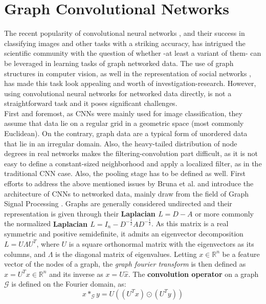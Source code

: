 \section{Graph Convolutional Networks}

The recent popularity of convolutional neural networks \cite{40k}, and their
success in classifying images and other tasks with a striking accuracy, has intrigued the scientific
community with the question of whether -at least a variant of them- can be leveraged in learning tasks
of graph networked data. The use of graph structures in computer
vision\cite{survey}, as well in the representation of social networks
\cite{kleinberg_book}, has made this task look appealing and worth of investigation-research.
However, using convolutional neural networks for
networked data directly, is not a straightforward task and it poses significant
challenges.\\
 First and foremost,
as CNNs were mainly used for image classification, they assume that
data lie on a regular grid in a geometric space (most commonly
Euclidean). On the contrary, graph data are a typical form of unordered data that lie in
an irregular domain. Also, the heavy-tailed distribution of node degrees
in real networks \cite{smth} makes the filtering-convolution part difficult,
as it is not easy to define a constant-sized neighborhood and apply a
localized filter, as in the traditional CNN case. Also, the pooling stage has to
be defined as well.
 First efforts to address the above mentioned issues
by Bruna et al. \cite{Lecun} and introduce the architecture of CNNs to networked data,
mainly draw from the field of Graph Signal Processing \cite{shuman}.
Graphs are generally considered undirected and their representation is given
through their \textbf{Laplacian $L = D -A$} or more commonly the normalized
\textbf{Laplacian $L = I_n - D^{-\frac{1}{2}}AD^{-\frac{1}{2}}$}. As this matrix
is a real symmetric and positive semidefinite, it admits an eigenvector
decomposition $L=U\Lambda U^T$, where $U$ is a square orthonormal matrix with
the eigenvectors as its columns, and $\Lambda$ is the diagonal matrix of eigenvalues.
Letting $x\in \mathbb{R}^{n}$ be a feature vector of the nodes of a graph,
the {\em graph fourier transform} is then defined as $\hat{x}=U^T x \in \mathbb{R}^n$
and its inverse as $x = U\hat{x}$. The \textbf{convolution operator} on a graph
$\mathcal{G}$ is defined on the Fourier domain, as:
\begin{equation*}
x *_{\mathcal{G}} y = U((U^T x)\odot (U^T y))
\end{equation*}
